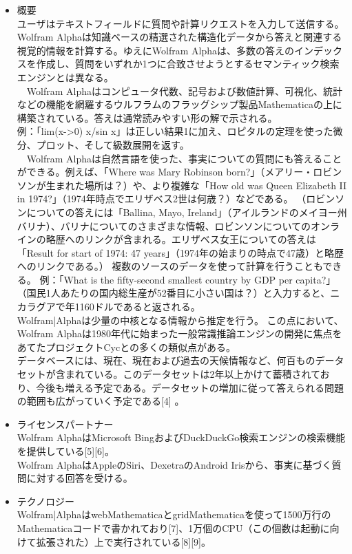 \begin{itemize}

\item 概要\\
ユーザはテキストフィールドに質問や計算リクエストを入力して送信する。Wolfram Alphaは知識ベースの精選された構造化データから答えと関連する視覚的情報を計算する。ゆえにWolfram Alphaは、多数の答えのインデックスを作成し、質問をいずれか1つに合致させようとするセマンティック検索エンジンとは異なる。\\
　Wolfram Alphaはコンピュータ代数、記号および数値計算、可視化、統計などの機能を網羅するウルフラムのフラッグシップ製品Mathematicaの上に構築されている。答えは通常読みやすい形の解で示される。\\
例：「lim(x->0) x/sin x」は正しい結果1に加え、ロピタルの定理を使った微分、プロット、そして級数展開を返す。\\
　Wolfram Alphaは自然言語を使った、事実についての質問にも答えることができる。例えば、「Where was Mary Robinson born?」（メアリー・ロビンソンが生まれた場所は？）や、より複雑な「How old was Queen Elizabeth II in 1974?」（1974年時点でエリザベス2世は何歳？）などである。 （ロビンソンについての答えには「Ballina, Mayo, Ireland」（アイルランドのメイヨー州バリナ）、バリナについてのさまざまな情報、ロビンソンについてのオンラインの略歴へのリンクが含まれる。エリザベス女王についての答えは「Result for start of 1974: 47 years」（1974年の始まりの時点で47歳）と略歴へのリンクである。）
複数のソースのデータを使って計算を行うこともできる。
例：「What is the fifty-second smallest country by GDP per capita?」（国民1人あたりの国内総生産が52番目に小さい国は？）と入力すると、ニカラグアで年1160ドルであると返される。\\
Wolfram|Alphaは少量の中核となる情報から推定を行う。 この点において、Wolfram Alphaは1980年代に始まった一般常識推論エンジンの開発に焦点をあてたプロジェクトCycとの多くの類似点がある。\\
データベースには、現在、現在および過去の天候情報など、何百ものデータセットが含まれている。このデータセットは2年以上かけて蓄積されており、今後も増える予定である。データセットの増加に従って答えられる問題の範囲も広がっていく予定である[4] 。

\item ライセンスパートナー\\
Wolfram AlphaはMicrosoft BingおよびDuckDuckGo検索エンジンの検索機能を提供している[5][6]。\\
Wolfram AlphaはAppleのSiri、DexetraのAndroid Irisから、事実に基づく質問に対する回答を受ける。\\
\item テクノロジー\\
Wolfram|AlphaはwebMathematicaとgridMathematicaを使って1500万行のMathematicaコードで書かれており[7]、1万個のCPU（この個数は起動に向けて拡張された）上で実行されている[8][9]。


\end{itemize}
